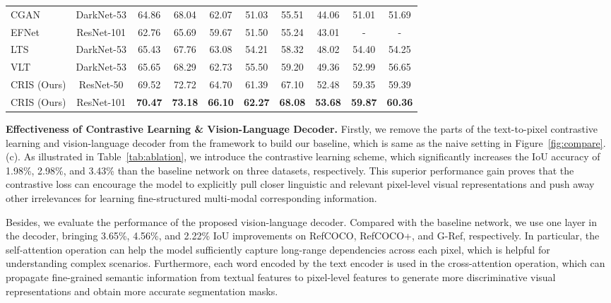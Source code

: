 \documentclass[10pt,twocolumn,letterpaper]{article}
\begin{document}
\begin{table*}[thbp]
\begin{center}
{\begin{tabular}{l|c|ccc|ccc|cc}
        CGAN \cite{luo2020cascade}             & DarkNet-53 & 64.86 & 68.04 & 62.07 & 51.03 & 55.51 & 44.06 & 51.01 & 51.69 \\
        EFNet \cite{feng2021encoder}           & ResNet-101 & 62.76 & 65.69 & 59.67 & 51.50 & 55.24 & 43.01 & - & - \\
        LTS \cite{jing2021locate}              & DarkNet-53 & 65.43 & 67.76 & 63.08 & 54.21 & 58.32 & 48.02 & 54.40 & 54.25 \\
        VLT \cite{ding2021vlt}                 & DarkNet-53 & 65.65 & 68.29 & 62.73 & 55.50 & 59.20 & 49.36 & 52.99 & 56.65 \\
        \midrule
        CRIS (Ours)                            & ResNet-50  & 69.52 & 72.72 & 64.70 & 61.39 & 67.10 & 52.48 & 59.35 & 59.39 \\
        CRIS (Ours)                            & ResNet-101 & \textbf{70.47} & \textbf{73.18} & \textbf{66.10} & \textbf{62.27} & \textbf{68.08} & \textbf{53.68} & \textbf{59.87} & \textbf{60.36} \\
        \bottomrule[1.2pt]
    \end{tabular}
    \label{tab:sota}}
    \end{center}
    \vspace{-5.0mm}
\end{table*}

\textbf{Effectiveness of Contrastive Learning \& Vision-Language Decoder.}
Firstly, we remove the parts of the text-to-pixel contrastive learning and vision-language decoder from the framework to build our baseline, which is same as the naive setting in Figure~\ref{fig:compare}.(c).
As illustrated in Table~\ref{tab:ablation}, we introduce the contrastive learning scheme, which significantly increases the IoU accuracy of 1.98\%, 2.98\%, and 3.43\% than the baseline network on three datasets, respectively.
This superior performance gain proves that the contrastive loss can encourage the model to explicitly pull closer linguistic and relevant pixel-level visual representations and push away other irrelevances for learning fine-structured multi-modal corresponding information.

Besides, we evaluate the performance of the proposed vision-language decoder. Compared with the baseline network, we use one layer in the decoder, bringing 3.65\%, 4.56\%, and 2.22\% IoU improvements on RefCOCO, RefCOCO+, and G-Ref, respectively.
In particular, the self-attention operation can help the model sufficiently capture long-range dependencies across each pixel, which is helpful for understanding complex scenarios.
Furthermore, each word encoded by the text encoder is used in the cross-attention operation, which can propagate fine-grained semantic information from textual features to pixel-level features to generate more discriminative visual representations and obtain more accurate segmentation masks.
\end{document}
